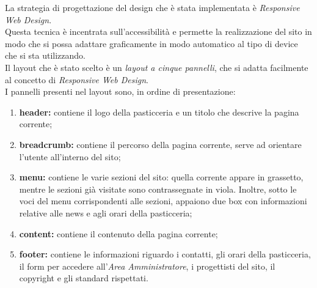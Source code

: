 La strategia di progettazione del design che è stata implementata è \emph{Responsive Web Design}.\\
Questa tecnica è incentrata sull'accessibilità e permette la realizzazione del sito in modo che si possa adattare graficamente in modo automatico al tipo di device che si sta utilizzando.\\ 
Il layout che è stato scelto è un \emph{layout a cinque pannelli}, che si adatta facilmente al concetto di \emph{Responsive Web Design}.\\
I pannelli presenti nel layout sono, in ordine di presentazione:
\begin{enumerate}
	\item \textbf{header:} contiene il logo della pasticceria e un titolo che descrive la pagina corrente;
	\item \textbf{breadcrumb:} contiene il percorso della pagina corrente, serve ad orientare l'utente all'interno del sito;
	\item \textbf{menu:} contiene le varie sezioni del sito: quella corrente appare in grassetto, mentre le sezioni già visitate sono contrassegnate in viola. Inoltre, sotto le voci del menu corrispondenti alle sezioni, 
	appaiono due box con informazioni relative alle news e agli orari della pasticceria;
	\item \textbf{content:} contiene il contenuto della pagina corrente;
	\item \textbf{footer:} contiene le informazioni riguardo i contatti, gli orari della pasticceria, il form per accedere all'\emph{Area Amministratore}, i progettisti del sito, il copyright e gli standard rispettati.
\end{enumerate}

